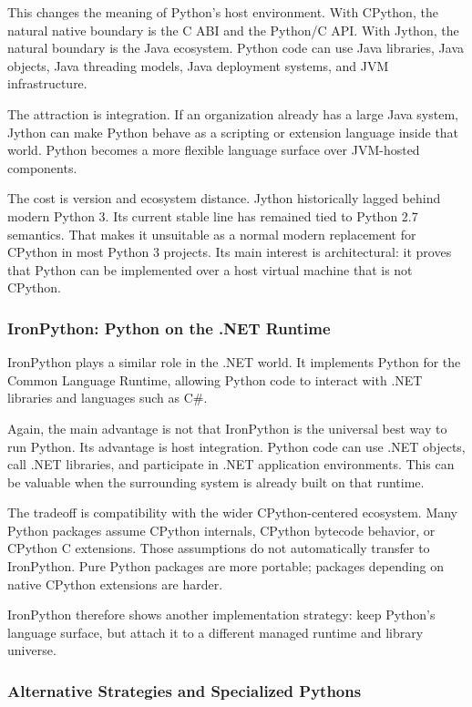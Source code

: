 This changes the meaning of Python's host environment. With CPython, the natural native boundary is the C ABI and the Python/C API. With Jython, the natural boundary is the Java ecosystem. Python code can use Java libraries, Java objects, Java threading models, Java deployment systems, and JVM infrastructure.

The attraction is integration. If an organization already has a large Java system, Jython can make Python behave as a scripting or extension language inside that world. Python becomes a more flexible language surface over JVM-hosted components.

The cost is version and ecosystem distance. Jython historically lagged behind modern Python 3. Its current stable line has remained tied to Python 2.7 semantics. That makes it unsuitable as a normal modern replacement for CPython in most Python 3 projects. Its main interest is architectural: it proves that Python can be implemented over a host virtual machine that is not CPython.

\subsubsection{IronPython: Python on the .NET Runtime}

IronPython plays a similar role in the .NET world. It implements Python for the Common Language Runtime, allowing Python code to interact with .NET libraries and languages such as C\#.

Again, the main advantage is not that IronPython is the universal best way to run Python. Its advantage is host integration. Python code can use .NET objects, call .NET libraries, and participate in .NET application environments. This can be valuable when the surrounding system is already built on that runtime.

The tradeoff is compatibility with the wider CPython-centered ecosystem. Many Python packages assume CPython internals, CPython bytecode behavior, or CPython C extensions. Those assumptions do not automatically transfer to IronPython. Pure Python packages are more portable; packages depending on native CPython extensions are harder.

IronPython therefore shows another implementation strategy: keep Python's language surface, but attach it to a different managed runtime and library universe.

\subsubsection{Alternative Strategies and Specialized Pythons}

